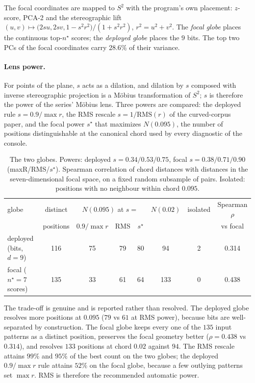 \documentclass[11pt,a4paper]{article}
\theoremstyle{plain}
\theoremstyle{remark}
\begin{document}
The focal coordinates are mapped to $S^2$ with the program's own placement: $z$-score, PCA-2 and the stereographic lift $(u,v)\mapsto\big(2su,2sv,1-s^2r^2\big)/(1+s^2r^2)$, $r^2=u^2+v^2$. The \emph{focal globe} places the continuous top-$n^\star$ scores; the \emph{deployed globe} places the $9$ bits. The top two PCs of the focal coordinates carry $28.6\%$ of their variance.

\paragraph{Lens power.} For points of the plane, $s$ acts as a dilation, and dilation by $s$ composed with inverse stereographic projection is a Möbius transformation of $S^2$; $s$ is therefore the power of the series' Möbius lens. Three powers are compared: the deployed rule $s=0.9/\max r$, the RMS rescale $s=1/\mathrm{RMS}(r)$ of the curved-corpus paper, and the focal power $s^\star$ that maximizes $N(0.095)$, the number of positions distinguishable at the canonical chord used by every diagnostic of the console.

\begin{table}[h]\centering\small
\begin{tabular}{lccccccc}
\toprule
globe & distinct & \multicolumn{3}{c}{$N(0.095)$ at $s=$} & $N(0.02)$ & isolated & Spearman $\rho$ \\
 & positions & $0.9/\max r$ & RMS & $s^\star$ & & & vs focal \\
\midrule
deployed (bits, $d=9$) & 116 & 75 & 79 & 80 & 94 & 2 & 0.314 \\
focal ($n^\star=7$ scores) & 135 & 33 & 61 & 64 & 133 & 0 & 0.438 \\
\bottomrule
\end{tabular}
\caption{The two globes. Powers: deployed $s=0.34/0.53/0.75$, focal $s=0.38/0.71/0.90$ (maxR/RMS/$s^\star$). Spearman correlation of chord distances with distances in the seven-dimensional focal space, on a fixed random subsample of pairs. Isolated: positions with no neighbour within chord $0.095$.}
\label{tab:globes}
\end{table}

The trade-off is genuine and is reported rather than resolved. The deployed globe resolves more positions at $0.095$ ($79$ vs $61$ at RMS power), because bits are well-separated by construction. The focal globe keeps every one of the $135$ input patterns as a distinct position, preserves the focal geometry better ($\rho=0.438$ vs $0.314$), and resolves $133$ positions at chord $0.02$ against $94$. The RMS rescale attains $99\%$ and $95\%$ of the best count on the two globes; the deployed $0.9/\max r$ rule attains $52\%$ on the focal globe, because a few outlying patterns set $\max r$. RMS is therefore the recommended automatic power.
\end{document}
